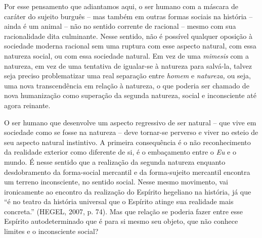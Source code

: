 Por esse pensamento que adiantamos aqui, o ser humano com a máscara de
caráter do sujeito burguês -- mas também em outras formas sociais na
história -- ainda é um animal -- não no sentido corrente de racional --
mesmo com sua racionalidade dita culminante. Nesse sentido, não é
possível qualquer oposição à sociedade moderna racional sem uma ruptura
com esse aspecto natural, com essa natureza social, ou com essa
sociedade natural. Em vez de uma \emph{mimesis} com a natureza, em vez
de uma tentativa de igualar-se à natureza para salvá-la, talvez seja
preciso problematizar uma real separação entre \emph{homem} e
\emph{natureza,} ou seja, uma nova transcendência em relação à natureza,
o que poderia ser chamado de nova humanização como superação da segunda
natureza, social e inconsciente até agora reinante.

O ser humano que desenvolve um aspecto regressivo de ser natural -- que
vive em sociedade como se fosse na natureza -- deve tornar-se perverso e
viver no esteio de seu aspecto natural instintivo. A primeira
consequência é o não reconhecimento da realidade exterior como diferente
de si, é o embaçamento entre o \emph{Eu} e o mundo. É nesse sentido que
a realização da segunda natureza enquanto desdobramento da forma-social
mercantil e da forma-sujeito mercantil encontra um terreno inconsciente,
no sentido social. Nesse mesmo movimento, vai ironicamente ao encontro
da realização do Espírito hegeliano na história, já que ``é no teatro da
história universal que o Espírito atinge sua realidade mais concreta.''
(HEGEL, 2007, p. 74). Mas que relação se poderia fazer entre esse
Espírito autodeterminado que é para si mesmo seu objeto, que não conhece
limites e o inconsciente social?

